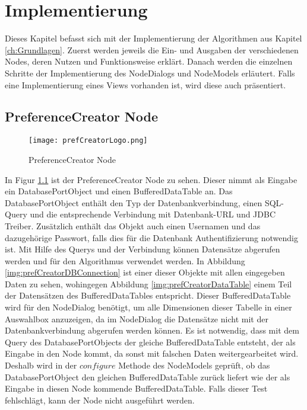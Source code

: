 \chapter{Implementierung}
\label{ch:Implementierung}
Dieses Kapitel befasst sich mit der Implementierung der Algorithmen aus Kapitel \ref{ch:Grundlagen}. Zuerst werden jeweils die Ein- und Ausgaben der verschiedenen Nodes, deren Nutzen und Funktionsweise erklärt. 
Danach werden die einzelnen Schritte der Implementierung des NodeDialogs und NodeModels erläutert. Falls eine Implementierung eines Views vorhanden ist, wird diese auch präsentiert.
\section{PreferenceCreator Node}
\label{ch:Implementierung:sec:prefCreatorNode}
\begin{figure}[H]
	\centering
	\texttt{[image: prefCreatorLogo.png]}
	\caption{PreferenceCreator Node}
	\label{img:prefCreatorLogo}
\end{figure} 

In Figur \ref{img:prefCreatorLogo} ist der PreferenceCreator Node zu sehen. Dieser nimmt als Eingabe ein DatabasePortObject und einen BufferedDataTable an. Das DatabasePortObject enthält den Typ der Datenbankverbindung, einen SQL-Query und die entsprechende Verbindung mit Datenbank-URL und JDBC Treiber. Zusätzlich enthält das Objekt auch einen Usernamen und das dazugehörige Passwort, falls dies für die Datenbank Authentifizierung notwendig ist. Mit Hilfe des Querys und der Verbindung können Datensätze abgerufen werden und für den Algorithmus verwendet werden. 
In Abbildung \ref{img:prefCreatorDBConnection} ist einer dieser Objekte mit allen eingegeben Daten zu sehen, wohingegen Abbildung \ref{img:prefCreatorDataTable} einem Teil der Datensätzen des BufferedDataTables entspricht. Dieser BufferedDataTable wird für den NodeDialog benötigt, um alle Dimensionen dieser Tabelle in einer Auswahlbox anzuzeigen, da im NodeDialog die Datensätze nicht mit der Datenbankverbindung abgerufen werden können. Es ist notwendig, dass mit dem Query des DatabasePortObjects der gleiche BufferedDataTable entsteht, der als Eingabe in den Node kommt, da sonst mit falschen Daten weitergearbeitet wird. Deshalb wird in der $configure$ Methode des NodeModels geprüft, ob das DatabasePortObject den gleichen BufferedDataTable zurück liefert wie der als Eingabe in diesen Node kommende BufferedDataTable. Falls dieser Test fehlschlägt, kann der Node nicht ausgeführt werden. 

